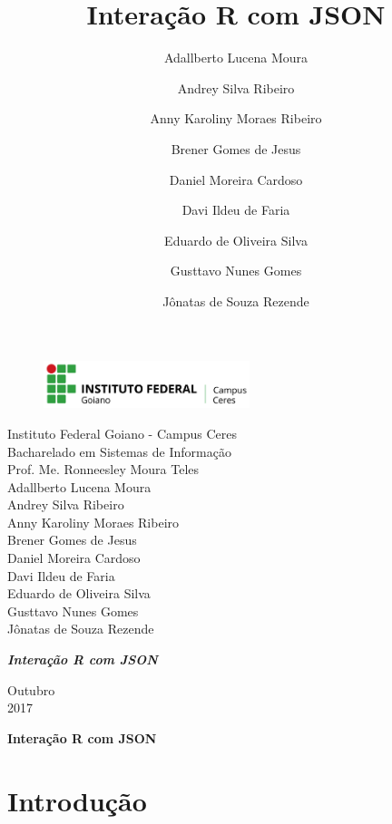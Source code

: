 \documentclass[12pt,a4paper]{article}
\title{Interação R com JSON}
\author{Adallberto Lucena Moura \and Andrey Silva Ribeiro \and Anny Karoliny Moraes Ribeiro \and Brener Gomes de Jesus \and Daniel Moreira Cardoso \and Davi Ildeu de Faria\and Eduardo de Oliveira Silva \and Gusttavo Nunes Gomes \and Jônatas de Souza Rezende}
\begin{document}
\begin{titlepage}


\begin{center}
\begin{figure}[htb]
		
		\label{figura:LogoIF}
	
		\centering
		\includegraphics[width=6cm]{logo.png} 
\end{figure}


Instituto Federal Goiano - Campus Ceres\\
Bacharelado em Sistemas de Informação\\
Prof. Me. Ronneesley Moura Teles\\\vspace{0.2cm}
Adallberto Lucena Moura \\
Andrey Silva Ribeiro \\
Anny Karoliny Moraes Ribeiro \\
Brener Gomes de Jesus \\
Daniel Moreira Cardoso \\
Davi Ildeu de Faria \\
Eduardo de Oliveira Silva \\
Gusttavo Nunes Gomes \\
Jônatas de Souza Rezende \\


\vspace{5.0cm}

\textit{\textbf{\Large{Interação R com JSON}}}\\\vspace{0.5cm}
\vspace{9.5cm}

Outubro\\
2017\\
\end{center}
\end{titlepage}



\tableofcontents

\newpage
\begin{center}
\textbf{\Large{Interação R com JSON}}\\\vspace{0.5cm}
\end{center}

\section{Introdução}
\end{document}
